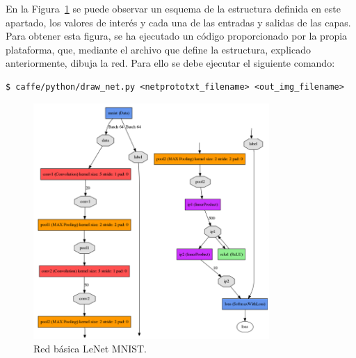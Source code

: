 	En la Figura~\ref{fig.redBasica} se puede observar un esquema de la estructura definida en este apartado, los valores de interés y cada una de las entradas y salidas de las capas. Para obtener esta figura, se ha ejecutado un código proporcionado por la propia plataforma, que, mediante el archivo que define la estructura, explicado anteriormente, dibuja la red. Para ello se debe ejecutar el siguiente comando:
	\vspace{10pt}
	\begin{lstlisting}[frame=single]
	$ caffe/python/draw_net.py <netprototxt_filename> <out_img_filename>
	\end{lstlisting}
	
	\begin{figure}[H]
		\begin{center}
			\includegraphics[width=0.8\textwidth]{figures/Original_net}
			\caption{Red básica LeNet MNIST.}
			\label{fig.redBasica}
		\end{center}
	\end{figure}
	
